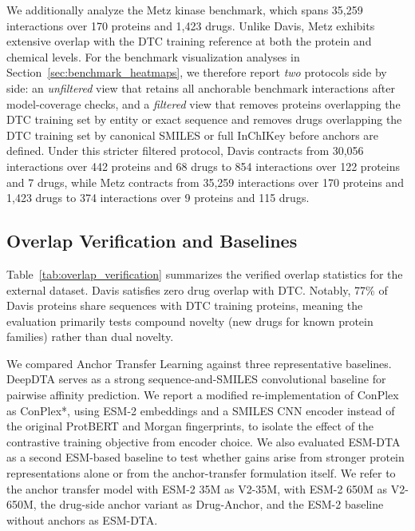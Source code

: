 We additionally analyze the Metz kinase benchmark, which spans 35,259 interactions over 170 proteins and 1,423 drugs. Unlike Davis, Metz exhibits extensive overlap with the DTC training reference at both the protein and chemical levels. For the benchmark visualization analyses in Section~\ref{sec:benchmark_heatmaps}, we therefore report \emph{two} protocols side by side: an \emph{unfiltered} view that retains all anchorable benchmark interactions after model-coverage checks, and a \emph{filtered} view that removes proteins overlapping the DTC training set by entity or exact sequence and removes drugs overlapping the DTC training set by canonical SMILES or full InChIKey before anchors are defined. Under this stricter filtered protocol, Davis contracts from 30,056 interactions over 442 proteins and 68 drugs to 854 interactions over 122 proteins and 7 drugs, while Metz contracts from 35,259 interactions over 170 proteins and 1,423 drugs to 374 interactions over 9 proteins and 115 drugs.

\subsection{Overlap Verification and Baselines}

Table~\ref{tab:overlap_verification} summarizes the verified overlap statistics for the external dataset. Davis satisfies zero drug overlap with DTC. Notably, 77\% of Davis proteins share sequences with DTC training proteins, meaning the evaluation primarily tests compound novelty (new drugs for known protein families) rather than dual novelty.

We compared Anchor Transfer Learning against three representative baselines. DeepDTA \cite{ozturk2018deepdta} serves as a strong sequence-and-SMILES convolutional baseline for pairwise affinity prediction. We report a modified re-implementation of ConPlex as ConPlex*, using ESM-2 embeddings and a SMILES CNN encoder instead of the original ProtBERT and Morgan fingerprints, to isolate the effect of the contrastive training objective from encoder choice. We also evaluated ESM-DTA as a second ESM-based baseline to test whether gains arise from stronger protein representations alone or from the anchor-transfer formulation itself. We refer to the anchor transfer model with ESM-2 35M as V2-35M, with ESM-2 650M as V2-650M, the drug-side anchor variant as Drug-Anchor, and the ESM-2 baseline without anchors as ESM-DTA.

